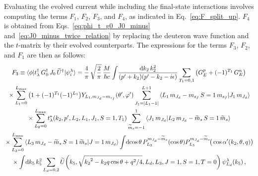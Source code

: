   Evaluating the evolved current while including the final-state interactions
  involves computing the terms $F_1$, $F_2$, $F_3$, and $F_4$, as indicated in
  Eq.~\eqref{eq:F_split_up}.  $F_4$ is obtained from
  Eqs.~\eqref{eq:phi_t_g0_J0_minus} and~\eqref{eq:J0_minus_twice_relation} by
  replacing the deuteron wave function and the $t$-matrix by their evolved
  counterparts.  The expressions for the terms $F_3$, $F_2$, and $F_1$ are then
  as follows:
  \begin{multline}
   F_3 \equiv \mbraket{\phi}{t_\lambda ^\dag \, G_0^\dag \,
   J_0 \, \widetilde{U}^\dag}{\psi_i^\lambda}
   = \frac{4}{\pi} \, \sqrt{\frac{2}{\pi}} \, \frac{M}{\hbar c}
   \int \! \frac{\dd k_2 \, k_2^2}{(\pp + k_2)(\pp - k_2 - i \epsilon)}
   \sum_{T_1 = 0,1} \big(G_E ^p + (-1)^{T_1} \,G_E^n\big) \\
   \null \times
   \sum_{L_1 = 0}^{L_{\rm max}} \big(1 + (-1)^{T_1} (-1)^{L_1}\big)
   Y_{L_1 , \mJd - \msf}(\thetacm, \phicm)
   \sum_{J_1 = |L_1 - 1|}^{L+1}
    \CG{L_1}{\mJd - \msf}{S=1}{\msf}{J_1}{\mJd} \\
    \null \times
   \sum_{L_2 = 0}^{L_{\rm max}}
    t^\ast_\lambda(k_2, \pp, L_2, L_1, J_1, S=1, T_1)
    \sum_{\widetilde{m}_s = -1}^1
    \braket{J_1 \, \mJd}{L_2 \, \mJd - \wt{m}_s \, S=1 \, \wt{m}_s} \\
    \null \times
   \sum_{L_3 = 0}^{L_{\rm max}}
    \CG{L_3}{\mJd - \widetilde{m}_s}{S = 1}{\widetilde{m}_s}{J=1}{\mJd}
   \int \! \dcostheta \, P_{L_2}^{\mJd - \widetilde{m}_s}(\cos \theta)
   P_{L_3}^{\mJd - \widetilde{m}_s}\!\big(\cos \thetacprime(k_2, \theta, q)
   \big) \\
   \null \times
   \int \! \dd k_5 \, k_5^2 \sum_{L_d = 0, 2}
   \widetilde{U}\!\left(
    k_5, \sqrt{{k_2}^2 - k_2 q \cos\theta + q^2/4}, L_d, L_3, J=1, S=1, T=0
   \right) \psi_{L_d}^\lambda (k_5) \,,
  \label{eq:F3}
  \end{multline}
